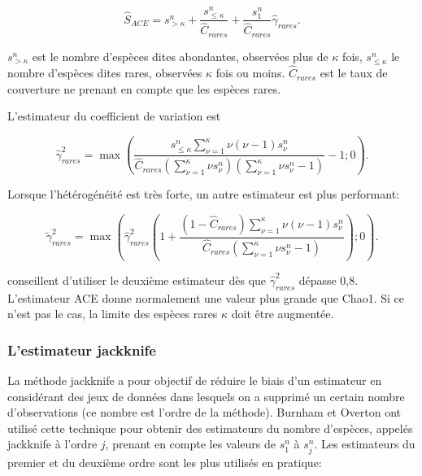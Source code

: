 \documentclass[
  11pt,
  french,
  a4paper,
  extrafontsizes,onecolumn,openright
  ]{memoir}
\newlength{\rf}
\begin{document}
\begin{equation}
  \label{eq:ACE}
  \hat{S}_{\mathit{ACE}} = s^{n}_{>\kappa} + \frac{s^{n}_{\le\kappa}}{\hat{C}_\mathit{rares}}+\frac{s^{n}_{1}}{{\hat{C}}_\mathit{rares}}{\hat{\gamma}}_\mathit{rares}.
\end{equation}

\(s^{n}_{>\kappa}\) est le nombre d'espèces dites abondantes, observées plus de \(\kappa\) fois, \(s^{n}_{\le\kappa}\) le nombre d'espèces dites rares, observées \(\kappa\) fois ou moins.
\(\hat{C}_\mathit{rares}\) est le taux de couverture ne prenant en compte que les espèces rares.

L'estimateur du coefficient de variation est

\begin{equation}
  \label{eq:ACEcv}
  \hat{\gamma}^{2}_\mathit{rares} = \max\left(\frac{s^{n}_{\le\kappa}\sum^{\kappa}_{\nu=1}{\nu\left(\nu-1\right){s^{n}_{\nu}}}}{\hat{C}_\mathit{rares}\left(\sum^{\kappa}_{\nu=1}{\nu s^{n}_{\nu}}\right)\left(\sum^{\kappa}_{\nu=1}{\nu s^{n}_{\nu}}-1\right)}-1; 0\right).
\end{equation}

Lorsque l'hétérogénéité est très forte, un autre estimateur est plus performant:

\begin{equation}
  \label{eq:ACEcv2}
  \tilde{\gamma}^{2}_\mathit{rares} = \max\left({\widehat{\gamma}}^2_\mathit{rares}\left(1+\frac{\left(1-{\hat{C}}_\mathit{rares}\right)\sum^{\kappa}_{\nu=1}{\nu\left(\nu -1\right){s^{n}_{\nu}}}}{{\hat{C}}_\mathit{rares}\left(\sum^{\kappa}_{\nu =1}{\nu s^{n}_{\nu}-1}\right)}\right); 0 \right).
\end{equation}

\textcite{Chao2010a} conseillent d'utiliser le deuxième estimateur dès que \({\widehat{\gamma}}^2_\mathit{rares}\) dépasse 0,8.
L'estimateur ACE donne normalement une valeur plus grande que Chao1.
Si ce n'est pas le cas, la limite des espèces rares \(\kappa\) doit être augmentée.

\hypertarget{lestimateur-jackknife}{%
\subsubsection{L'estimateur jackknife}\label{lestimateur-jackknife}}

La méthode jackknife a pour objectif de réduire le biais d'un estimateur en considérant des jeux de données dans lesquels on a supprimé un certain nombre d'observations (ce nombre est l'ordre de la méthode).
Burnham et Overton \autocite*{Burnham1978,Burnham1979} ont utilisé cette technique pour obtenir des estimateurs du nombre d'espèces, appelés jackknife à l'ordre \(j\), prenant en compte les valeurs de \(s^{n}_{1}\) à \(s^{n}_{j}\).
Les estimateurs du premier et du deuxième ordre sont les plus utilisés en pratique:
\end{document}
